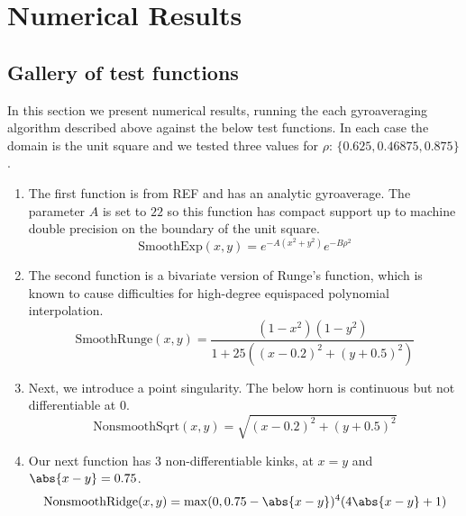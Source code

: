 \chapter{Numerical Results\label{chap:NumericalResults}}

\section{Gallery of test functions\label{sec:TestFunctions}}

In this section we present numerical results, running the each gyroaveraging algorithm described above against the below test functions.  In each case the domain is the unit square and we tested three values for $\rho$: $\{0.625, 0.46875,0.875 \}  $.  \\
\begin{enumerate}
	\item The first function  is from REF and has an analytic gyroaverage. The parameter $A$ is set to $22$ so this function has compact support up to machine double precision on the boundary of the unit square.
	\[  \text{SmoothExp}(x,y) = e^{-A(x^2+y^2)} e^{-B\rho^2}\]
	\item The second function is a bivariate version of Runge's function, which is known to cause difficulties for high-degree equispaced polynomial interpolation.
	\[ \text{SmoothRunge}(x,y) = \frac{(1-x^2)(1-y^2) }{1 + 25(   (x-0.2)^2 + (y+0.5)^2)} \]  
	\item Next, we introduce a point singularity.  The below horn is continuous but not differentiable at 0.
	\[  \text{NonsmoothSqrt}(x,y) = \sqrt{(x-0.2)^2 + (y+0.5)^2} \]
	\item Our next function has 3 non-differentiable kinks, at $x=y$ and $\abs{x-y} = 0.75$.
	\[  \text{NonsmoothRidge}(x,y) = \max(0,0.75-\abs{x-y})^4(4\abs{x-y}+1) \]
\end{enumerate}



